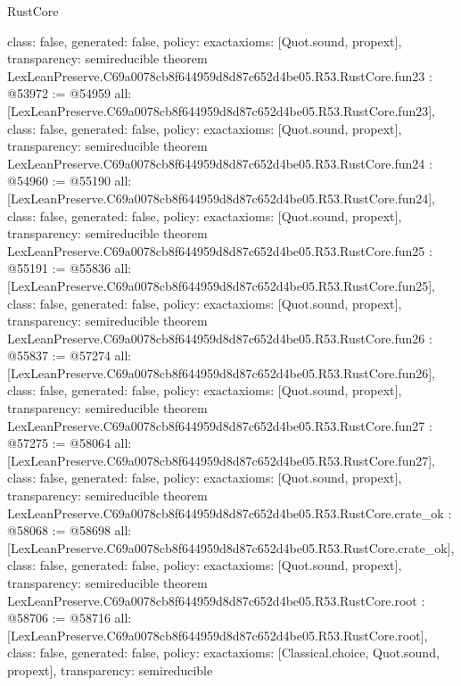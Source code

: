 \begin{lexlean}{RustCore}
\begin{coremodule}
{  class: false,
  generated: false,
  policy: exact{axioms: [Quot.sound, propext]},
  transparency: semireducible
}
theorem LexLeanPreserve.C69a0078cb8f644959d8d87c652d4be05.R53.RustCore.fun23 : @53972 := @54959 {
  all: [LexLeanPreserve.C69a0078cb8f644959d8d87c652d4be05.R53.RustCore.fun23],
  class: false,
  generated: false,
  policy: exact{axioms: [Quot.sound, propext]},
  transparency: semireducible
}
theorem LexLeanPreserve.C69a0078cb8f644959d8d87c652d4be05.R53.RustCore.fun24 : @54960 := @55190 {
  all: [LexLeanPreserve.C69a0078cb8f644959d8d87c652d4be05.R53.RustCore.fun24],
  class: false,
  generated: false,
  policy: exact{axioms: [Quot.sound, propext]},
  transparency: semireducible
}
theorem LexLeanPreserve.C69a0078cb8f644959d8d87c652d4be05.R53.RustCore.fun25 : @55191 := @55836 {
  all: [LexLeanPreserve.C69a0078cb8f644959d8d87c652d4be05.R53.RustCore.fun25],
  class: false,
  generated: false,
  policy: exact{axioms: [Quot.sound, propext]},
  transparency: semireducible
}
theorem LexLeanPreserve.C69a0078cb8f644959d8d87c652d4be05.R53.RustCore.fun26 : @55837 := @57274 {
  all: [LexLeanPreserve.C69a0078cb8f644959d8d87c652d4be05.R53.RustCore.fun26],
  class: false,
  generated: false,
  policy: exact{axioms: [Quot.sound, propext]},
  transparency: semireducible
}
theorem LexLeanPreserve.C69a0078cb8f644959d8d87c652d4be05.R53.RustCore.fun27 : @57275 := @58064 {
  all: [LexLeanPreserve.C69a0078cb8f644959d8d87c652d4be05.R53.RustCore.fun27],
  class: false,
  generated: false,
  policy: exact{axioms: [Quot.sound, propext]},
  transparency: semireducible
}
theorem LexLeanPreserve.C69a0078cb8f644959d8d87c652d4be05.R53.RustCore.crate_ok : @58068 := @58698 {
  all: [LexLeanPreserve.C69a0078cb8f644959d8d87c652d4be05.R53.RustCore.crate_ok],
  class: false,
  generated: false,
  policy: exact{axioms: [Quot.sound, propext]},
  transparency: semireducible
}
theorem LexLeanPreserve.C69a0078cb8f644959d8d87c652d4be05.R53.RustCore.root : @58706 := @58716 {
  all: [LexLeanPreserve.C69a0078cb8f644959d8d87c652d4be05.R53.RustCore.root],
  class: false,
  generated: false,
  policy: exact{axioms: [Classical.choice, Quot.sound, propext]},
  transparency: semireducible
}


\end{coremodule}
\end{lexlean}
